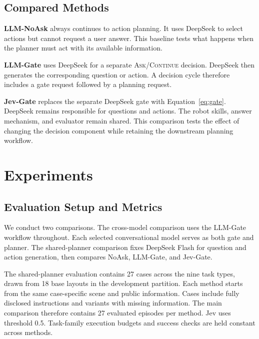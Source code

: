 \documentclass{article}
\newcommand{\ask}{\textsc{Ask}}
\newcommand{\cont}{\textsc{Continue}}
\begin{document}
\subsection{Compared Methods}

\textbf{LLM-NoAsk} always continues to action planning. It uses DeepSeek to
select actions but cannot request a user answer. This baseline tests what
happens when the planner must act with its available information.

\textbf{LLM-Gate} uses DeepSeek for a separate \ask{}/\cont{} decision.
DeepSeek then generates the corresponding question or action. A decision
cycle therefore includes a gate request followed by a planning request.

\textbf{Jev-Gate} replaces the separate DeepSeek gate with
Equation~\ref{eq:gate}. DeepSeek remains responsible for questions and actions.
The robot skills, answer mechanism, and evaluator remain shared. This
comparison tests the effect of changing the decision component while
retaining the downstream planning workflow.

\section{Experiments}

\subsection{Evaluation Setup and Metrics}

We conduct two comparisons. The cross-model comparison uses the LLM-Gate
workflow throughout. Each selected conversational model serves as both gate
and planner. The shared-planner comparison fixes DeepSeek Flash for question
and action generation, then compares NoAsk, LLM-Gate, and Jev-Gate.

The shared-planner evaluation contains 27 cases across the nine task types,
drawn from 18 base layouts in the development partition. Each method starts
from the same case-specific scene and public information. Cases include
fully disclosed instructions and variants with missing information.
The main comparison therefore contains 27 evaluated episodes per method.
Jev uses threshold 0.5. Task-family execution budgets and success checks are
held constant across methods.
\end{document}
